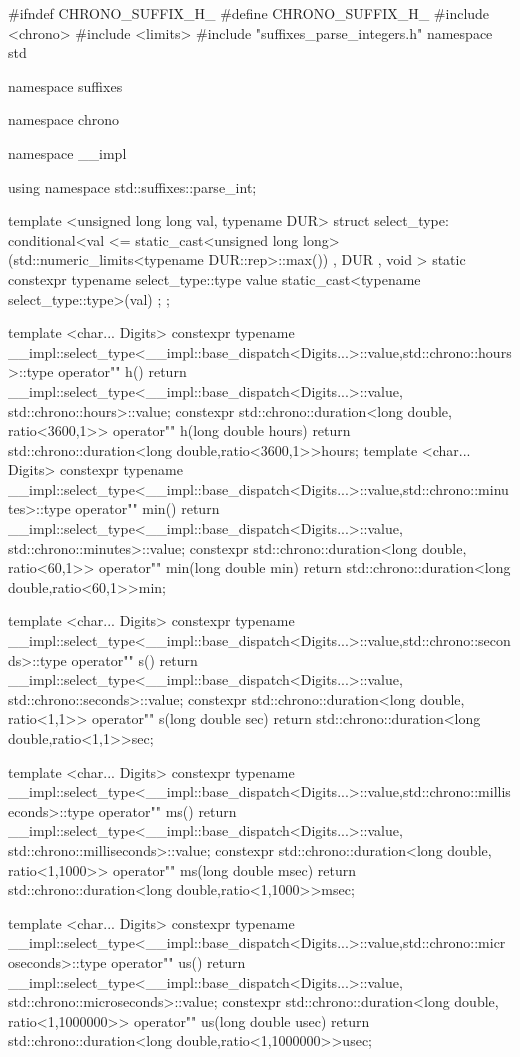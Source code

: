\documentclass[ebook,11pt,article]{memoir}
\begin{document}
\begin{codeblock}
#ifndef CHRONO_SUFFIX_H_
#define CHRONO_SUFFIX_H_
#include <chrono>
#include <limits>
#include "suffixes_parse_integers.h"
namespace std {
namespace suffixes {
namespace chrono {

namespace __impl {
using namespace std::suffixes::parse_int;

template <unsigned long long val, typename DUR>
struct select_type:
    conditional<val <=
      static_cast<unsigned long long>(std::numeric_limits<typename DUR::rep>::max())
    , DUR
    , void > {
        static constexpr typename select_type::type
            value{ static_cast<typename select_type::type>(val) };
    };
}

template <char... Digits>
constexpr typename 
__impl::select_type<__impl::base_dispatch<Digits...>::value,std::chrono::hours>::type
operator"" h(){
    return  __impl::select_type<__impl::base_dispatch<Digits...>::value,
                std::chrono::hours>::value;
}
constexpr std::chrono::duration<long double, ratio<3600,1>> operator"" h(long double hours){
    return std::chrono::duration<long double,ratio<3600,1>>{hours};
}
template <char... Digits>
constexpr typename 
__impl::select_type<__impl::base_dispatch<Digits...>::value,std::chrono::minutes>::type
operator"" min(){
    return __impl::select_type<__impl::base_dispatch<Digits...>::value,
               std::chrono::minutes>::value;
}
constexpr std::chrono::duration<long double, ratio<60,1>> operator"" min(long double min){
    return std::chrono::duration<long double,ratio<60,1>>{min};
}

template <char... Digits>
constexpr typename 
__impl::select_type<__impl::base_dispatch<Digits...>::value,std::chrono::seconds>::type
operator"" s(){
    return __impl::select_type<__impl::base_dispatch<Digits...>::value,
               std::chrono::seconds>::value;
}
constexpr std::chrono::duration<long double, ratio<1,1>> operator"" s(long double sec){
    return std::chrono::duration<long double,ratio<1,1>>{sec};
}

template <char... Digits>
constexpr typename 
__impl::select_type<__impl::base_dispatch<Digits...>::value,std::chrono::milliseconds>::type
operator"" ms(){
    return __impl::select_type<__impl::base_dispatch<Digits...>::value,
               std::chrono::milliseconds>::value;
}
constexpr std::chrono::duration<long double, ratio<1,1000>> operator"" ms(long double msec){
    return std::chrono::duration<long double,ratio<1,1000>>{msec};
}

template <char... Digits>
constexpr typename 
__impl::select_type<__impl::base_dispatch<Digits...>::value,std::chrono::microseconds>::type
operator"" us(){
    return __impl::select_type<__impl::base_dispatch<Digits...>::value,
               std::chrono::microseconds>::value;
}
constexpr std::chrono::duration<long double, ratio<1,1000000>> operator"" us(long double usec){
    return std::chrono::duration<long double,ratio<1,1000000>>{usec};
}

}}}
\end{codeblock}
\end{document}
